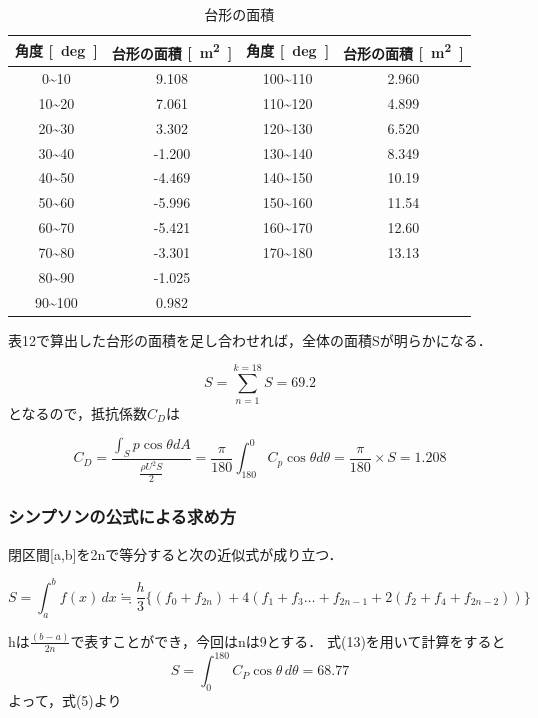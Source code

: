 \documentclass[a4paper,titlepage]{ltjsarticle}
\begin{document}
\begin{table}[hbtp]
  \caption{台形の面積}
  \centering
  \begin{tabular}{cccc}
    \toprule
    角度 {\si{[deg]}}& 台形の面積 {\si{[m^2]}} & 角度 {\si{[deg]}}& 台形の面積 {\si{[m^2]}} \\
    \hline
   0\sim10 & 9.108 & 100\sim110 & 2.960\\
   10\sim20 & 7.061& 110\sim120 & 4.899\\
   20\sim30 & 3.302& 120\sim130 & 6.520\\
   30\sim40 & -1.200& 130\sim140 & 8.349\\
   40\sim50 & -4.469& 140\sim150 & 10.19\\
   50\sim60 & -5.996& 150\sim160 & 11.54\\
   60\sim70 & -5.421& 160\sim170 & 12.60\\
   70\sim80 & -3.301& 170\sim180 & 13.13\\
   80\sim90 & -1.025& \\
   90\sim100 & 0.982&  & \\
 \bottomrule
  \end{tabular}
\end{table}

表12で算出した台形の面積を足し合わせれば，全体の面積Sが明らかになる．

\begin{equation}
  S=\sum_{n = 1}^{k=18}S =69.2
\end{equation}
となるので，抵抗係数$C_D$は

\begin{equation}
  C_D=\frac{\int _Sp\cos \theta dA}{\frac{\rho U^2S}{2}}=\frac{\pi}{180}\int_{180}^{0} C_p\cos \theta d\theta 
  \label{cd}=\frac{\pi}{180}\times S= 1.208
\end{equation}

\subsubsection{シンプソンの公式による求め方}
閉区間[a,b]を2nで等分すると次の近似式が成り立つ．

\begin{equation}
  S=\int_{a}^{b} f(x) \,dx \fallingdotseq \frac{h}{3}\{ (f_0+f_{2n})+4(f_1+f_3…+f_{2n-1}+2(f_2+f_4+f_{2n-2}))\} 
\end{equation}

hは$\frac{(b-a)}{2n}$で表すことができ，今回はnは9とする．
式(13)を用いて計算をすると
\begin{equation}
  S=\int_{0}^{180}C_P\cos\theta  \,d\theta = 68.77
\end{equation}
よって，式(5)より
\end{document}
